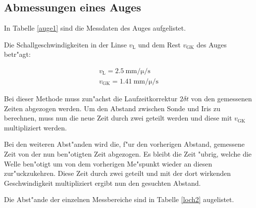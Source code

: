 \subsection{Abmessungen eines Auges} %
\label{sub:das_auge}



In Tabelle \ref{auge1} sind die Messdaten des Auges aufgelistet.

Die Schallgeschwindigkeiten in der Linse $v_\mathrm{L}$ und dem Rest $v_\mathrm{GK}$ des Auges betr"agt:

\begin{eqnarray*}
	v_\mathrm{L} = \SI{2.5}{\milli\meter\per\micro\per\second}\\
	v_\mathrm{GK} = \SI{1.41}{\milli\meter\per\micro\per\second}
\end{eqnarray*}

Bei dieser Methode muss zun"achst die Laufzeitkorrektur $2 \delta t$ von den gemessenen Zeiten abgezogen werden.
Um den Abstand zwischen Sonde und Iris zu berechnen, muss nun die neue Zeit durch zwei geteilt werden und diese mit $v_\mathrm{GK}$ multipliziert werden.

Bei den weiteren Abst"anden wird die, f"ur den vorherigen Abstand, gemessene Zeit von der nun ben"otigten Zeit abgezogen. Es bleibt die Zeit "ubrig, welche die Welle ben"otigt um von dem vorherigen Me"spunkt wieder an diesen zur"uckzukehren. Diese Zeit durch zwei geteilt und mit der dort wirkenden Geschwindigkeit multipliziert ergibt nun den gesuchten Abstand.

Die Abst"ande der einzelnen Messbereiche sind in Tabelle \ref{loch2} augelistet.
\clearpage


